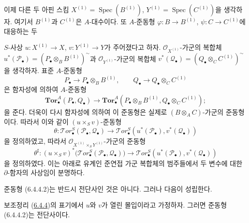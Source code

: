 \begin{env}[6.4.4]
\label{III.6.4.4-fr}
이제 다른 두 아핀 스킴
$X^{(1)}=\operatorname{Spec}(B^{(1)})$,
$Y^{(1)}=\operatorname{Spec}(C^{(1)})$을 생각하자. 여기서
$B^{(1)}$과 $C^{(1)}$은 $A$-대수이다. 또 $A$-준동형
$\varphi:B\to B^{(1)}$, $\psi:C\to C^{(1)}$에 대응하는 두


$S$-사상 $u:X^{(1)}\to X$, $v:Y^{(1)}\to Y$가 주어졌다고 하자.
$\mathscr O_{X^{(1)}}$-가군의 복합체
$u^*(\mathscr P_\bullet)=(P_\bullet\otimes_B B^{(1)})^{\sim}$과
$\mathscr O_{Y^{(1)}}$-가군의 복합체
$v^*(\mathscr Q_\bullet)=(Q_\bullet\otimes_C C^{(1)})^{\sim}$을
생각하자. 표준 $A$-준동형
\[
  P_\bullet\longrightarrow P_\bullet\otimes_B B^{(1)},
  \qquad
  Q_\bullet\longrightarrow Q_\bullet\otimes_C C^{(1)}
\]
은 함자성에 의하여 $A$-준동형
\[
  \mathbf{Tor}_\bullet^A(P_\bullet,Q_\bullet)
  \longrightarrow
  \mathbf{Tor}_\bullet^A
  (P_\bullet\otimes_B B^{(1)},Q_\bullet\otimes_C C^{(1)});
\]
을 준다. 더욱이 다시 함자성에 의하여 이 준동형은 실제로
$(B\otimes_A C)$-가군의 준동형이다. 따라서 이와 같이
$(u\times_S v)$-준동형
\[
  \theta:\mathscr{T}\!or_\bullet^S(\mathscr P_\bullet,\mathscr Q_\bullet)
  \longrightarrow
  \mathscr{T}\!or_\bullet^S
  (u^*(\mathscr P_\bullet),v^*(\mathscr Q_\bullet))
  \tag{6.4.4.1}\label{III.6.4.4.1.fr}
\]
을 정의하였고, 따라서 $\mathscr O_{X^{(1)}\times_S Y^{(1)}}$-가군의
준동형
\[
  \theta^\sharp:(u\times_S v)^*
  \bigl(\mathscr{T}\!or_\bullet^S(\mathscr P_\bullet,\mathscr Q_\bullet)\bigr)
  \longrightarrow
  \mathscr{T}\!or_\bullet^S
  (u^*(\mathscr P_\bullet),v^*(\mathscr Q_\bullet))
  \tag{6.4.4.2}\label{III.6.4.4.2.fr}
\]
을 정의하였다. 이는 아래로 유계인 준연접 가군 복합체의 범주들에서
두 변수에 대한 $\partial$-함자의 사상임이 분명하다.

준동형 (6.4.4.2)는 반드시 전단사인 것은 아니다. 그러나 다음이
성립한다.
\end{env}

\begin{namedtheorem}[6.4.5]{보조정리}
\label{III.6.4.5-fr}
(\hyperref[III.6.4.4-fr]{6.4.4})의 표기에서 $u$와 $v$가 열린 몰입이라고
가정하자. 그러면 준동형 (6.4.4.2)는 전단사이다.
\end{namedtheorem}

